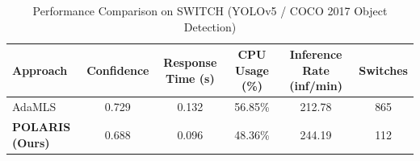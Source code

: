 \begin{table}[t]
\centering
\caption{Performance Comparison on SWITCH (YOLOv5 / COCO 2017 Object Detection)}
\label{tab:switch_results}
\small
\begin{tabular}{lccccc}
\toprule
\textbf{Approach} & \textbf{Confidence} & \textbf{Response Time (s)} & \textbf{CPU Usage (\%)} & \textbf{Inference Rate (inf/min)} & \textbf{Switches} \\
\midrule
AdaMLS & 0.729 & 0.132 & 56.85\% & 212.78 & 865 \\
\textbf{POLARIS (Ours)} & 0.688 & 0.096 & 48.36\% & 244.19 & 112 \\
\bottomrule
\end{tabular}
\end{table}
